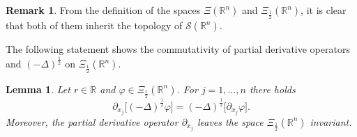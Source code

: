 \documentclass[reqno,11pt]{amsart}
\newtheorem{lemma}[theorem]{Lemma}
\theoremstyle{definition}
\newtheorem{remark}[theorem]{Remark}
\def\R{\mathbb{R}}
\begin{document}
\begin{remark}
	From the definition of the spaces $\Xi(\mathbb{R}^n)$ and  $\Xi_{\frac{1}{2}}(\R^n)$, it is clear that both of them inherit the topology of $\mathcal{S}(\R^n)$.
\end{remark}


The following statement shows the commutativity of partial derivative operators and $(-\Delta)^\frac{1}{2}$ on $\Xi_\frac{1}{2}(\R^n)$.


\begin{lemma}\label{item3rem}
	Let $r\in \R$ and $\varphi\in \Xi_{\frac{1}{2}}(\R^n)$. For $j=1,\ldots ,n $ there holds $$\partial_{x_j}\big[(-\Delta)^{\frac{1}{2}}\varphi\big] =(-\Delta)^{\frac{1}{2}}\big[\partial_{x_j}\varphi\big].
$$ Moreover, the partial derivative operator $\partial_{x_j}$ leaves the space  $\Xi_{\frac{1}{2}}(\R^n)$ invariant.
	
\end{lemma}
\end{document}
